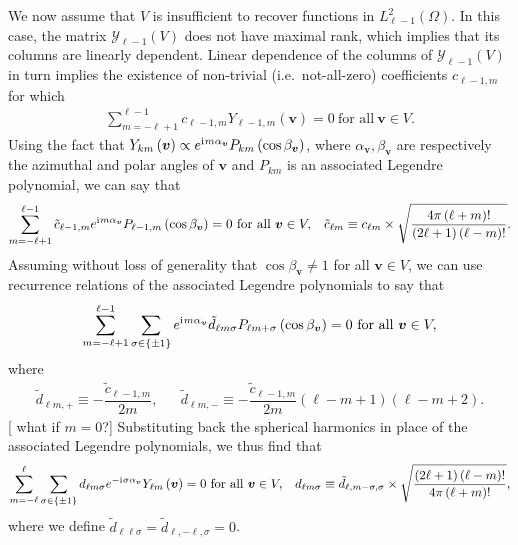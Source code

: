 \documentclass[nofootinbib,notitlepage,twocolumn]{revtex4-2}
\renewcommand{\t}{\text} %
\newcommand{\f}[2]{\dfrac{#1}{#2}} %
\newcommand{\p}[1]{\left(#1\right)} %
\renewcommand{\set}[1]{\left\{#1\right\}} %
\renewcommand{\v}{\bm} %
\renewcommand{\i}{\mathrm{i}\mkern1mu} %
\newcommand{\1}{\mathds{1}}
\newcommand{\Y}{\mathcal{Y}}
\newcommand{\red}[1]{{\color{red} #1}}
\begin{document}
We now assume that $V$ is insufficient to recover functions in $L^2_{\ell-1}\p{\Omega}$.
In this case, the matrix $\Y_{\ell-1}\p{V}$ does not have maximal rank, which implies that its columns are linearly dependent.
Linear dependence of the columns of $\Y_{\ell-1}\p{V}$ in turn implies the existence of non-trivial (i.e.~not-all-zero) coefficients $c_{\ell-1,m}$ for which
\begin{align}
  \sum_{m=-\ell+1}^{\ell-1} c_{\ell-1,m} Y_{\ell-1,m}\p{\v v}
  = 0 ~\t{for all}~ \v v\in V.
\end{align}
Using the fact that $Y_{km}\p{\v v}\propto e^{\i m\alpha_{\v v}} P_{km}\p{\cos\beta_{\v v}}$, where $\alpha_{\v v},\beta_{\v v}$ are respectively the azimuthal and polar angles of $\v v$ and $P_{km}$ is an associated Legendre polynomial, we can say that
\begin{align}
  \sum_{m=-\ell+1}^{\ell-1} \tilde c_{\ell-1,m} e^{\i m\alpha_{\v v}} P_{\ell-1,m}\p{\cos\beta_{\v v}}
  = 0 ~\t{for all}~ \v v\in V,
  &&
  \tilde c_{\ell m} \equiv c_{\ell m}
  \times \sqrt{\f{4\pi\p{\ell+m}!}{\p{2\ell+1}\p{\ell-m}!}}.
\end{align}
Assuming without loss of generality that $\cos\beta_{\v v}\ne1$ for all $\v v\in V$, we can use recurrence relations of the associated Legendre polynomials to say that
\begin{align}
  \sum_{m=-\ell+1}^{\ell-1} \sum_{\sigma\in\set{\pm1}}
  e^{\i m\alpha_{\v v}} \tilde d_{\ell m\sigma}
  P_{\ell m+\sigma}\p{\cos\beta_{\v v}}
  = 0 ~\t{for all}~ \v v\in V,
\end{align}
where
\begin{align}
  \tilde d_{\ell m,+} \equiv -\f{\tilde c_{\ell-1,m}}{2m},
  &&
  \tilde d_{\ell m,-} \equiv -\f{\tilde c_{\ell-1,m}}{2m}
  \p{\ell-m+1} \p{\ell-m+2}.
\end{align}
[\red{what if $m=0$?}] Substituting back the spherical harmonics in place of the associated Legendre polynomials, we thus find that
\begin{align}
  \sum_{m=-\ell}^\ell \sum_{\sigma\in\set{\pm 1}}
  d_{\ell m\sigma} e^{-\i\sigma\alpha_{\v v}} Y_{\ell m}\p{\v v} = 0
  ~\t{for all}~ \v v\in V,
  &&
  d_{\ell m\sigma} \equiv \tilde d_{\ell,m-\sigma,\sigma}
  \times \sqrt{\f{\p{2\ell+1}\p{\ell-m}!}{4\pi\p{\ell+m}!}},
\end{align}
where we define $\tilde d_{\ell\ell\sigma} = \tilde d_{\ell,-\ell,\sigma} = 0$.

\vspace{.5cm}
\end{document}
